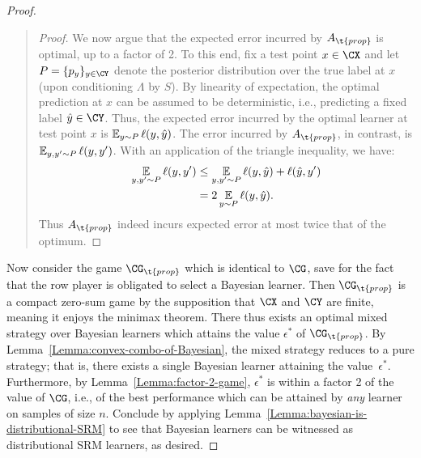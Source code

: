\documentclass[11pt]{article}
\begin{document}
\begin{proof}
\begin{quote}
\begin{proof}
We now argue that the expected error incurred by $A_{\t{prop}}$ is optimal, up to a factor of 2.  To this end, fix a test point $x \in \CX$ and let $P = \{p_y\}_{y \in \CY}$ denote the posterior distribution over the true label at $x$ (upon conditioning $\Lambda$ by $S$). By linearity of expectation, the optimal prediction at $x$ can be assumed to be deterministic, i.e., predicting a fixed label $\hat{y} \in \CY$. Thus, the expected error incurred by the optimal learner at test point $x$ is $\operatorname*{\mathbb{E}}_{y \sim P} \ell(y, \hat{y})$. The error incurred by $A_{\t{prop}}$, in contrast, is $\operatorname*{\mathbb{E}}_{y, y' \sim P} \ell(y, y')$. With an application of the triangle inequality, we have: 
\begin{align*}
\operatorname*{\mathbb{E}}_{y, y' \sim P} \ell(y, y') &\leq \operatorname*{\mathbb{E}}_{y, y' \sim P} \ell(y, \hat{y}) + \ell(\hat{y}, y') \\
&= 2 \operatorname*{\mathbb{E}}_{y \sim P} \ell(y, \hat{y}). 
\end{align*}
Thus $A_{\t{prop}}$ indeed incurs expected error at most twice that of the optimum. 
\end{proof}
\end{quote}

Now consider the game $\CG_{\t{prop}}$ which is identical to $\CG$, save for the fact that the row player is obligated to select a Bayesian learner. Then $\CG_{\t{prop}}$ is a compact zero-sum game by the supposition that $\CX$ and $\CY$ are finite, meaning it enjoys the minimax theorem. There thus exists an optimal mixed strategy over Bayesian learners which attains the value $\epsilon^*$ of $\CG_{\t{prop}}$. By Lemma~\ref{Lemma:convex-combo-of-Bayesian}, the mixed strategy reduces to a pure strategy; that is, there exists a single Bayesian learner attaining the value~$\epsilon^*$. Furthermore, by Lemma~\ref{Lemma:factor-2-game}, $\epsilon^*$ is within a factor 2 of the value of $\CG$, i.e., of the best performance which can be attained by \emph{any} learner on samples of size $n$. Conclude by applying Lemma~\ref{Lemma:bayesian-is-distributional-SRM} to see that Bayesian learners can be witnessed as distributional SRM learners, as desired.
\end{proof}
\end{document}
